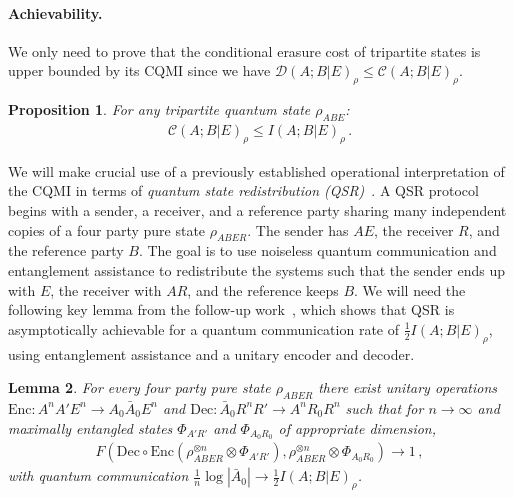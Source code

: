 \documentclass[a4paper,aps,prl,twocolumn,10pt,superscriptaddress]{revtex4-1}
\theoremstyle{plain}
\newtheorem{lemma}{Lemma}
\newtheorem{prop}[lemma]{Proposition}
\theoremstyle{definition}
\begin{document}



\paragraph{Achievability.} We only need to prove that the conditional erasure cost of tripartite states is upper bounded by its CQMI since we have $\mathcal{D}(A;B|E)_\rho\leq\mathcal{C}(A;B|E)_\rho$.

\begin{prop}\label{prop:CQMI-upper-decons}
For any tripartite quantum state $\rho_{ABE}$:
\begin{align*}
\mathcal{C}(A;B|E)_\rho\leq I(A;B|E)_{\rho}\,.
\end{align*}
\end{prop}

We will make crucial use of a previously established operational interpretation of the CQMI in terms of {\it quantum state redistribution (QSR)}~\cite{DY08}. A QSR protocol begins with a sender, a receiver, and a reference party sharing many independent copies of a four party pure state $\rho_{ABER}$. The sender has $AE$, the receiver $R$, and the reference party $B$. The goal is to use noiseless quantum communication and entanglement assistance to redistribute the systems such that the sender ends up with $E$, the receiver with $AR$, and the reference keeps $B$. We will need the following key lemma from the follow-up work~\cite{PhysRevA.78.030302}, which shows that QSR is asymptotically achievable for a quantum communication rate of $\frac{1}{2}I(A;B|E)_\rho$, using entanglement assistance and a unitary encoder and decoder.

\begin{lemma}\cite[Thm.~3]{PhysRevA.78.030302}\label{lem:state_redistribution}
For every four party pure state $\rho_{ABER}$ there exist unitary operations $\mathrm{Enc}:A^nA'E^n\to A_0\bar{A}_0E^n$ and $\mathrm{Dec}:\bar{A}_0R^nR'\to A^nR_0R^n$ such that for $n\to\infty$ and maximally entangled states $\Phi_{A'R'}$ and $\Phi_{A_0R_0}$ of appropriate dimension,
\begin{align*}
F\left(\mathrm{Dec}\circ\mathrm{Enc}\left(\rho_{ABER}^{\otimes n}\otimes\Phi_{A'R'}\right),\rho_{ABER}^{\otimes n}\otimes\Phi_{A_0R_0}\right)\to1\,,
\end{align*}
with quantum communication $\frac{1}{n}\log|\bar{A}_0|\to\frac{1}{2}I(A;B|E)_\rho$.
\end{lemma}
\end{document}
